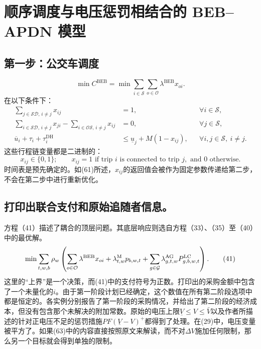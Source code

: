 \documentclass{article}
\begin{document}
\section*{顺序调度与电压惩罚相结合的 BEB–APDN 模型}

\subsection*{第一步：公交车调度}
\begin{equation}
\min C^{\mathrm{BEB}}=\min\sum_{i\in\mathcal S}\sum_{o\in\mathcal O}\lambda^{\mathrm{BEB}}x_{oi}.
\tag{61}
\end{equation}
在以下条件下：
\begin{align}
\sum_{j\in\mathcal{SD},\,i\ne j}x_{ij}&=1,
&&\forall i\in\mathcal S,\tag{7}\\
\sum_{i\in\mathcal{SD},\,i\ne j}x_{ji}-\sum_{i\in\mathcal{OS},\,i\ne j}x_{ij}&=0,
&&\forall j\in\mathcal S,\tag{8}\\
\overline u_i+\tau_i+\tau_i^{\mathrm{DH}}&\leq\underline u_j+M(1-x_{ij}),
&&\forall i,j\in\mathcal S,\ i\ne j.\tag{9}
\end{align}
这些行程链变量都是二进制的：
\[
x_{ij}\in\{0,1\};\qquad
x_{ij}=1\text{ if trip }i\text{ is connected to trip }j,\text{ and }0\text{ otherwise}.
\]
时间表是预先确定的。如(61)所述，\(x_{ij}\)的返回值会被作为固定参数传递给第二步，不会在第二步中进行重新优化。


\subsection*{打印出联合支付和原始追随者信息。}
方程（41）描述了耦合的顶层问题。其底层响应则选自方程（33）、（35）至（40）中的最优解。
\begin{equation}
\min \sum_{t,w,b}\rho_w\left(\sum_{o\in\mathcal O}\lambda^{\rm BEB}x_{oi}
   +\lambda^{\rm M}_{t,w}p_{b,w,t}
   +\sum_{g\in\mathcal G}\lambda^{\rm AG}_{g,t,w}P^{\rm LC}_{g,b,w,t}\right).\tag{41}
\end{equation}
这里的“上界”是一个决策，而(41)中的支付符号为正数。打印出的采购金额中包含了一个未量化的\(i\)。由于第一阶段计划已经确定，这个数值在所有第二阶段选项中都是恒定的。各实例分别报告了第一阶段的采购情况，并给出了第二阶段的经济成本，但没有包含那个未解决的附加常数。原始的电压上限\(\underline V\le V\le\bar V\)以及作者所描述的针对正电压不足的惩罚措施\(PF(\underline V-V)^+\)都得到了处理。在(29)中，电压变量被平方了。如果(63)中的内容直接按照原文来解读，而不对\(\Delta V\)施加任何限制，那么另一个目标就会得到单独的限制。
\end{document}
